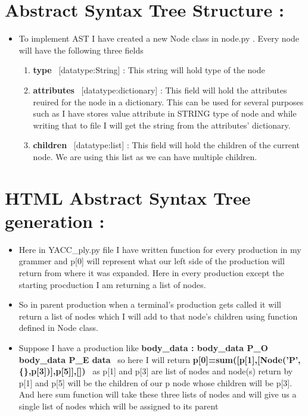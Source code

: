 \documentclass{article}
\begin{document}
\section{Abstract Syntax Tree Structure : 
}
\begin{itemize}
\item To implement AST I have created a new Node class in node.py . Every node will have the following three fields
\begin{enumerate}
\item \textbf{type
}\ [datatype:String] : This string will hold type of the node

\item \textbf{attributes
}\ [datatype:dictionary] : This field will hold the attributes reuired for the node in a dictionary. This can be used for several purposes such as I have stores value attribute in STRING type of node and while writing that to file I will get the string from the attributes' dictionary.

\item \textbf{children
}\ [datatype:list] : This field will hold the children of the current node. We are using this list as we can have multiple children.

\end{enumerate}

\end{itemize}
\section{HTML Abstract Syntax Tree generation :
}
\begin{itemize}
\item Here in YACC\_ply.py file I have written function for every production in my grammer and p[0] will represent what our left side of the production will return from where it was expanded. Here in every production except the starting procduction I am returning a list of nodes.

\item So in parent production when a terminal's production gets called it will return a list of nodes which I will add to that node's children using function defined in Node class.

\item Suppose I have a production like 
\textbf{body\_data : body\_data P\_O body\_data P\_E data
}\ so here I will return 
\textbf{p[0]=sum([p[1],[Node('P',\{\},p[3])],p[5]],[])
}\ as p[1] and p[3] are list of nodes and node(s) return by p[1] and p[5] will be the children of our p node whose children will be p[3]. And here sum function will take these three lists of nodes and will give us a single list of nodes which will be assigned to its parent

\end{itemize}
\end{document}
